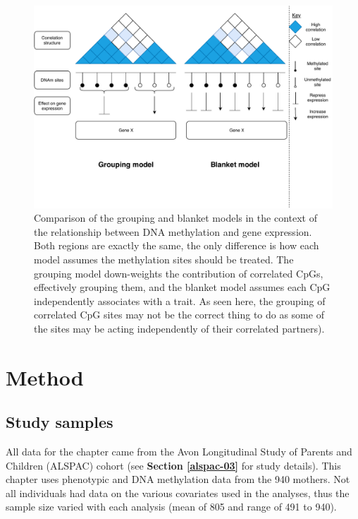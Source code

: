 \documentclass[11pt,oneside]{bristolthesis}
\begin{document}
\begin{figure}

{\centering \includegraphics[width=1\linewidth]{figure/05-h2ewas/m2_model_comparison} 

}

\caption{Comparison of the grouping and blanket models in the context of the relationship between DNA methylation and gene expression. Both regions are exactly the same, the only difference is how each model assumes the methylation sites should be treated. The grouping model down-weights the contribution of correlated CpGs, effectively grouping them, and the blanket model assumes each CpG independently associates with a trait. As seen here, the grouping of correlated CpG sites may not be the correct thing to do as some of the sites may be acting independently of their correlated partners).}\label{fig:h2ewas-model-comp}
\end{figure}
\hypertarget{method-05}{%
\section{Method}\label{method-05}}

\hypertarget{study-samples-05}{%
\subsection{Study samples}\label{study-samples-05}}

All data for the chapter came from the Avon Longitudinal Study of Parents and Children (ALSPAC) cohort (see \textbf{Section \ref{alspac-03}} for study details). This chapter uses phenotypic and DNA methylation data from the 940 mothers. Not all individuals had data on the various covariates used in the analyses, thus the sample size varied with each analysis (mean of 805 and range of 491 to 940).
\end{document}
